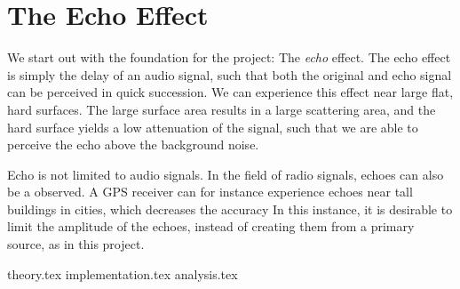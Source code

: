 
\section{The Echo Effect}
We start out with the foundation for the project: The \emph{echo} effect. The echo effect is simply the delay of an audio signal, such that both the original and echo signal can be perceived in quick succession. We can experience this effect near large flat, hard surfaces. The large surface area results in a large scattering area, and the hard surface yields a low attenuation of the signal, such that we are able to perceive the echo above the background noise.

Echo is not limited to audio signals. In the field of radio signals, echoes can also be a observed. A GPS receiver can for instance experience echoes near tall buildings in cities, which decreases the accuracy In this instance, it is desirable to limit the amplitude of the echoes, instead of creating them from a primary source, as in this project.

{theory.tex}
{implementation.tex}
{analysis.tex}
